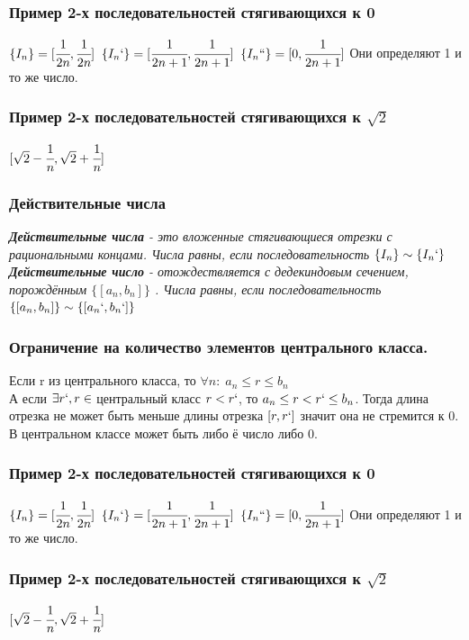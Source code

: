 \documentclass[12pt, a4paper]{article}
\begin{document}
\begin{centering}
\subsubsection*{Пример 2-х последовательностей стягивающихся к 0}
$\{I_n\} = [\cfrac{1}{2n},\cfrac{1}{2n}]\;\; \{I_n`\} = [\cfrac{1}{2n+1},\cfrac{1}{2n+1}] \;\; \{I_n``\} = [0,\cfrac{1}{2n+1}]$ Они определяют 1 и то же число.
\subsubsection*{Пример 2-х последовательностей стягивающихся к $\sqrt{2}$}
$[\sqrt{2} - \cfrac{1}{n}, \sqrt{2} + \cfrac{1}{n}]$
\subsubsection{Действительные числа}
\begin{tcolorbox}
\textit{\textbf{Действительные числа} - это вложенные стягивающиеся отрезки с рациональными концами. Числа равны, если последовательность $\{I_n\} \sim \{I_n`\}$  }\\
\textit{\textbf{Действительные число} - отождествляется с дедекиндовым сечением, порождённым $\{[a_n, b_n]\}$ . Числа равны, если последовательность $\{[a_n, b_n]\} \sim \{[a_n`, b_n`]\}$  }
\end{tcolorbox}

\subsubsection*{Ограничение на количество элементов центрального класса.}
Если r из центрального класса, то $\forall n: \; a_n \leq r \leq b_n$\\
А если $\exists r`,r \in $ центральный класс $r<r`$, то $a_n \leq r < r` \leq b_n$. Тогда длина отрезка не может быть меньше длины отрезка $[r,r`]$ значит она не стремится к 0.\\
В центральном классе может быть либо ё число либо 0.
\subsubsection*{Пример 2-х последовательностей стягивающихся к 0}
$\{I_n\} = [\cfrac{1}{2n},\cfrac{1}{2n}]\;\; \{I_n`\} = [\cfrac{1}{2n+1},\cfrac{1}{2n+1}] \;\; \{I_n``\} = [0,\cfrac{1}{2n+1}]$ Они определяют 1 и то же число.
\subsubsection*{Пример 2-х последовательностей стягивающихся к $\sqrt{2}$}
$[\sqrt{2} - \cfrac{1}{n}, \sqrt{2} + \cfrac{1}{n}]$


\end{centering}
\end{document}
